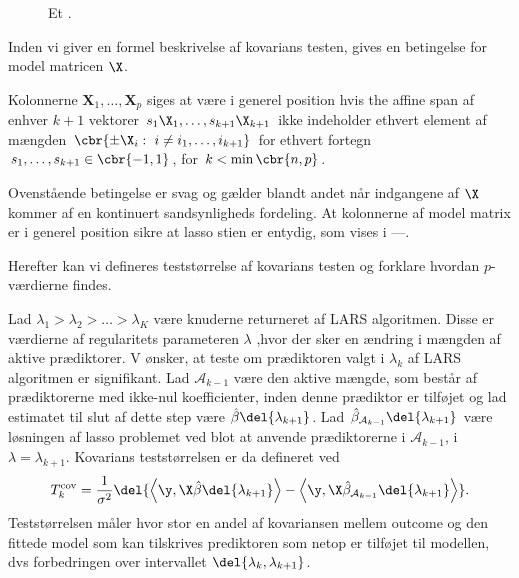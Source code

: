 %
\begin{figure}[H]
\centering
\caption{Et .}
\label{fig:covarians_test}
\end{figure}
%

Inden vi giver en formel beskrivelse af kovarians testen, gives en betingelse for model matricen \(\X\).
\begin{defn}
Kolonnerne \(\mathbf{X}_1, \ldots, \mathbf{X}_p\) siges at være i generel position hvis the affine span af enhver \(k+1\) vektorer \(s_1 \X_1, \ldots, s_{k+1} \X_{k+1}\) ikke indeholder ethvert element af mængden \(\cbr{\pm \X_i : \ i \neq i_1, \ldots, i_{k+1}}\) for ethvert fortegn \(s_1, \ldots, s_{k+1} \in \cbr{-1,1}\), for \(k < \min \cbr{n,p}\). 
\end{defn}
Ovenstående betingelse er svag og gælder blandt andet når indgangene af \(\X\) kommer af en kontinuert sandsynligheds fordeling.
At kolonnerne af model matrix er i generel position sikre at lasso stien er entydig, som vises i ---.

Herefter kan vi defineres teststørrelse af kovarians testen og forklare hvordan \(p\)-værdierne findes.




Lad $\lambda_1 > \lambda_2 > \ldots > \lambda_K$ være knuderne returneret af LARS algoritmen.
Disse er værdierne af regularitets parameteren $\lambda$ ,hvor der sker en ændring i mængden af aktive prædiktorer.
V ønsker, at teste om prædiktoren valgt i \(\lambda_k\) af LARS algoritmen er signifikant.
Lad \(\mathcal{A}_{k-1}\) være den aktive mængde, som består af prædiktorerne med ikke-nul koefficienter, inden denne prædiktor er tilføjet og lad estimatet til slut af dette step være \(\hat{\beta} \del{\lambda_{k+1}}\).
Lad \(\hat{\beta}_{\mathcal{A}_{k-1}} \del{\lambda_{k+1}}\) være løsningen af lasso problemet ved blot at anvende prædiktorerne  i \(\mathcal{A}_{k-1}\), i \(\lambda=\lambda_{k+1}\).
Kovarians teststørrelsen er da defineret ved
\begin{align}
T_k^\text{cov} = \frac{1}{\sigma^2} \del{ \left\langle \y, \X \hat{\beta} \del{\lambda_{k+1}} \right\rangle - \left\langle  \y, \X \hat{\beta}_{\mathcal{A}_{k-1}} \del{\lambda_{k+1}} \right\rangle}. \label{eq:6.5}
\end{align}
Teststørrelsen måler hvor stor en andel af kovariansen mellem outcome og den fittede model som kan tilskrives prediktoren som netop er tilføjet til modellen, dvs forbedringen over intervallet \(\del{\lambda_k, \lambda_{k+1}}\).

